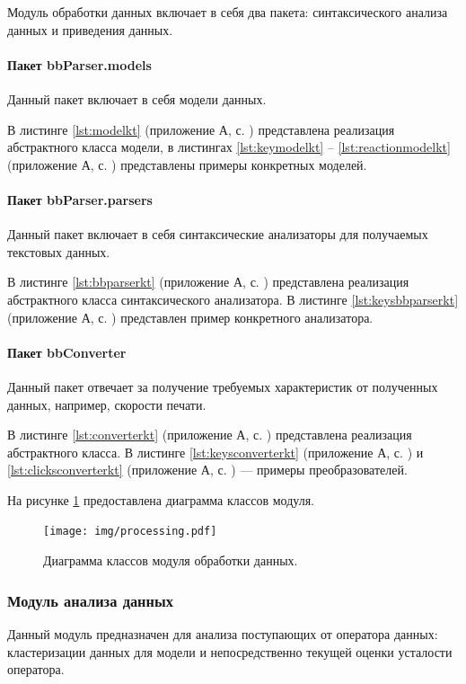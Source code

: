 Модуль обработки данных включает в себя два пакета: синтаксического анализа данных и приведения данных.

\paragraph{Пакет bbParser.models \newline}
Данный пакет включает в себя модели данных.

В листинге \ref{lst:modelkt} (приложение А, с. \pageref{chp:application-a}) представлена реализация абстрактного класса модели, в листингах \ref{lst:keymodelkt} -- \ref{lst:reactionmodelkt} (приложение А, с. \pageref{chp:application-a}) представлены примеры конкретных моделей.

\paragraph{Пакет bbParser.parsers \newline}
Данный пакет включает в себя синтаксические анализаторы для получаемых текстовых данных.

В листинге \ref{lst:bbparserkt} (приложение А, с. \pageref{chp:application-a}) представлена реализация абстрактного класса синтаксического анализатора. В листинге \ref{lst:keysbbparserkt} (приложение А, с. \pageref{chp:application-a}) представлен пример конкретного анализатора.

\paragraph{Пакет bbConverter \newline}
Данный пакет отвечает за получение требуемых характеристик от полученных данных, например, скорости печати.

В листинге \ref{lst:converterkt} (приложение А, с. \pageref{chp:application-a}) представлена реализация абстрактного класса. В листинге \ref{lst:keysconverterkt} (приложение А, с. \pageref{chp:application-a}) и \ref{lst:clicksconverterkt} (приложение А, с. \pageref{chp:application-a}) --- примеры преобразователей.

На рисунке \ref{fig:processingUml} предоставлена диаграмма классов модуля.
\begin{figure}[H]
	\centering
	\texttt{[image: img/processing.pdf]}
	\caption{Диаграмма классов модуля обработки данных.}
	\label{fig:processingUml}
\end{figure}

\subsubsection{Модуль анализа данных}
Данный модуль предназначен для анализа поступающих от оператора данных: кластеризации данных для модели и непосредственно текущей оценки усталости оператора.

